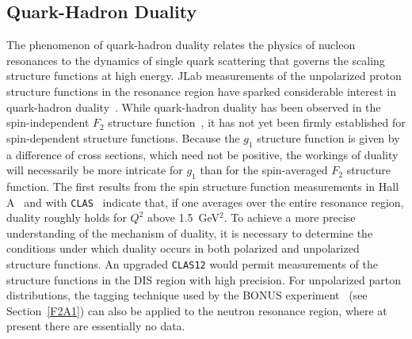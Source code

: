 \subsection{Quark-Hadron Duality} 
\label{duality}

The phenomenon of quark-hadron duality relates the physics of nucleon 
resonances to the dynamics of single quark scattering that governs the 
scaling structure functions at high energy.  JLab measurements of the 
unpolarized proton structure functions in the resonance region 
\cite{Niculescu:2000tk,ERIC} have sparked considerable interest in 
quark-hadron duality~\cite{Bloom:1970xb,Bloom:1971ye,DeRujula:1976tz,
Isgur:2001bt}.  While quark-hadron duality has been observed in the
spin-independent $F_2$ structure function~\cite{Bloom:1970xb,Bloom:1971ye,
Niculescu:2000tk}, it has not yet been firmly established for spin-dependent 
structure functions.  Because the $g_1$ structure function is given by a 
difference of cross sections, which need not be positive, the workings of 
duality will necessarily be more intricate for $g_1$ than for the
spin-averaged $F_2$ structure function.  The first results from the spin 
structure function measurements in Hall A~\cite{Amarian:2003jy,E01-012} and 
with {\tt CLAS}~\cite{Bosted:2006gp} indicate that, if one averages over 
the entire resonance region, duality roughly holds for $Q^2$ above 
1.5~GeV$^2$. To achieve a more precise understanding of the mechanism of 
duality, it is necessary to determine the conditions under which duality 
occurs in both polarized and unpolarized structure functions.  An upgraded 
{\tt CLAS12} would permit measurements of the structure functions in the 
DIS region with high precision.  For unpolarized parton distributions, the 
tagging technique used by the BONUS experiment~\cite{BONUS} (see 
Section~\ref{F2A1}) can also be applied to the neutron resonance region, 
where at present there are essentially no data.



